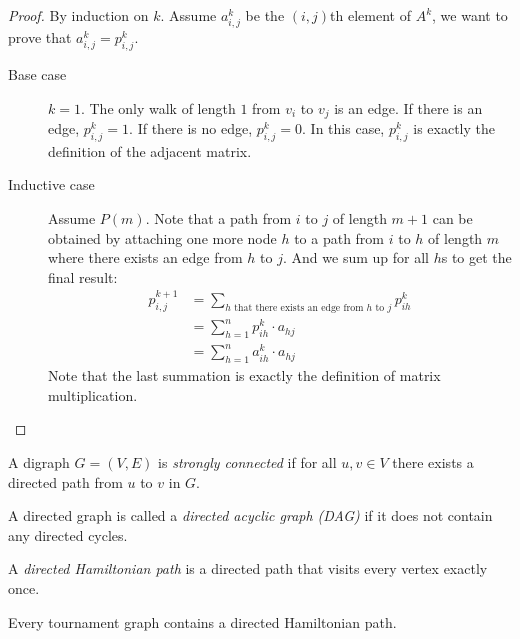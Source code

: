 \documentclass[11pt]{article}
\begin{document}
\begin{proof}
By induction on $k$. Assume $a_{i,j}^k$ be the $(i,j)$th element of $A^k$, we want to prove that
$a_{i,j}^k=p_{i,j}^k$.

\begin{description}
\item[Base case] $k=1$. The only walk of length $1$ from $v_i$ to $v_j$ is an edge. If there is
an edge, $p_{i,j}^k=1$. If there is no edge, $p_{i,j}^k=0$. In this case, $p_{i,j}^k$ is exactly
the definition of the adjacent matrix.

\item[Inductive case] Assume $P(m)$. Note that a path from $i$ to $j$ of length $m+1$ can be
obtained by attaching one more node $h$ to a path from $i$ to $h$ of length $m$ where there exists
an edge from $h$ to $j$. And we sum up for all $h$s to get the final result:
\begin{align*}
p_{i,j}^{k+1} &= \sum_{h\text{ that there exists an edge from }h\text{ to }j} p_{ih}^k \\
&= \sum_{h=1}^n p_{ih}^k \cdot a_{hj} \\
&= \sum_{h=1}^n a_{ih}^k \cdot a_{hj}
\end{align*}
Note that the last summation is exactly the definition of matrix multiplication.
\end{description}
\end{proof}

\begin{definition}
A digraph $G=(V,E)$ is \emph{strongly connected} if for all $u,v \in V$ there exists a directed
path from $u$ to $v$ in $G$.
\end{definition}

\begin{definition}
A directed graph is called a \emph{directed acyclic graph (DAG)} if it does not contain any
directed cycles.
\end{definition}

\begin{definition}
A \emph{directed Hamiltonian path} is a directed path that visits every vertex exactly once.
\end{definition}

\begin{theorem}
Every tournament graph contains a directed Hamiltonian path.
\end{theorem}
\end{document}
